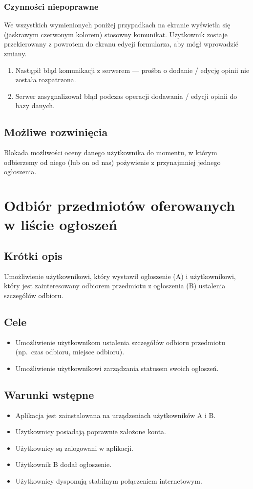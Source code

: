 \documentclass[licencjacka]{pracamgr}
\begin{document}
    \subsubsection{Czynności niepoprawne}
    We wszystkich wymienionych poniżej przypadkach na ekranie wyświetla się (jaskrawym czerwonym kolorem) stosowny komunikat. Użytkownik zostaje
    przekierowany z powrotem do ekranu edycji formularza, aby mógł wprowadzić zmiany.
    \begin{enumerate}
        \item Nastąpił błąd komunikacji z serwerem --- prośba o dodanie / edycję opinii nie została rozpatrzona.
        \item Serwer zasygnalizował błąd podczas operacji dodawania / edycji opinii do bazy danych.
    \end{enumerate}
    \subsection{Możliwe rozwinięcia}
    Blokada możliwości oceny danego użytkownika do momentu, w którym odbierzemy od niego (lub on od nas) pożywienie z przynajmniej jednego ogłoszenia.

\section{Odbiór przedmiotów oferowanych w liście ogłoszeń}
    \subsection{Krótki opis}
    Umożliwienie użytkownikowi, który wystawił ogłoszenie (A) i użytkownikowi, który jest zainteresowany odbiorem przedmiotu z ogłoszenia (B) ustalenia szczegółów odbioru.
    \subsection{Cele}
    \begin{itemize}
        \item Umożliwienie użytkownikom ustalenia szczegółów odbioru przedmiotu (np.\ czas odbioru, miejsce odbioru).
        \item Umożliwienie użytkownikowi zarządzania statusem swoich ogłoszeń.
    \end{itemize}
    \subsection{Warunki wstępne}
    \begin{itemize}
        \item Aplikacja jest zainstalowana na urządzeniach użytkowników A i B.
        \item Użytkownicy posiadają poprawnie założone konta.
        \item Użytkownicy są zalogowani w aplikacji.
        \item Użytkownik B dodał ogłoszenie.
        \item Użytkownicy dysponują stabilnym połączeniem internetowym.
    \end{itemize}
\end{document}
